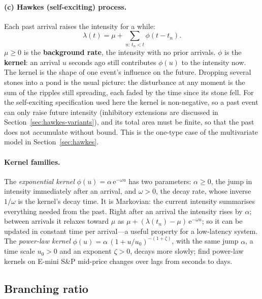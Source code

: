 \paragraph{(c) Hawkes (self-exciting) process.} Each past arrival raises the intensity for a while:
\[
  \lambda(t) = \mu + \sum_{n:\, t_n < t} \phi(t - t_n).
\]
$\mu \ge 0$ is the \textbf{background rate}, the intensity with no prior arrivals.
$\phi$ is the \textbf{kernel}: an arrival $u$ seconds ago still contributes $\phi(u)$ to the
intensity now. The kernel is the shape of one event's influence on the future. Dropping several
stones into a pond is the usual picture: the disturbance at any moment is the sum of the ripples
still spreading, each faded by the time since its stone fell. For the self-exciting specification
used here the kernel is non-negative, so a past event can only raise future intensity (inhibitory
extensions are discussed in Section~\ref{sec:hawkes-variants}), and its total area
must be finite, so that the past does not accumulate without bound. This is the one-type case of
the multivariate model in Section~\ref{sec:hawkes}.

\paragraph{Kernel families.} The \emph{exponential kernel} $\phi(u) = \alpha\, \mathrm{e}^{-\omega u}$ has
two parameters: $\alpha \ge 0$, the jump in intensity immediately after an arrival, and
$\omega > 0$, the decay rate, whose inverse $1/\omega$ is the kernel's decay time. It is Markovian:
the current intensity summarises everything needed from the past. Right after an arrival the
intensity rises by $\alpha$; between arrivals it relaxes toward $\mu$ as
$\mu + (\lambda(t_n) - \mu)\, \mathrm{e}^{-\omega u}$; so it can be updated in constant time per arrival---a useful
property for a low-latency system. The \emph{power-law kernel} $\phi(u) = \alpha\,(1 + u/u_0)^{-(1+\zeta)}$, with
the same jump $\alpha$, a time scale $u_0 > 0$ and an exponent $\zeta > 0$, decays more slowly; \citet{hardimanbercotbouchaud2013} find power-law kernels on
E-mini S\&P mid-price changes over lags from seconds to days.

\subsection{Branching ratio}
\label{app:pp-branching}

